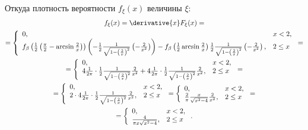 Откуда плотность вероятности $f_\xi(x)$ величины $\xi$:
\begin{multline}
    f_\xi(x)
    = \derivative{x} F_\xi(x) = \\
    = \left \{
    \begin{array}{ll}
        0,                                                                                                                                                                                                                                                                                                                                                                           & x < 2 , \\
        f_\beta \left ( \frac{1}{2} \left ( \frac{\pi}{2} - \arcsin \frac{2}{x} \right ) \right ) \left ( - \frac{1}{2} \frac{1}{\sqrt{ 1 - \left ( \frac{2}{x} \right )^2}} \left ( - \frac{2}{x^2} \right ) \right ) - f_\beta \left ( \frac{1}{2} \arcsin \frac{2}{x} \right ) \frac{1}{2} \frac{1}{\sqrt{ 1 - \left ( \frac{2}{x} \right )^2}} \left ( - \frac{2}{x^2} \right ), & 2 \le x
    \end{array}
    \right . = \\
    = \left \{
    \begin{array}{ll}
        0,                                                                                                                                                                                                               & x < 2 , \\
        4 \frac{1}{2 \pi} \cdot \frac{1}{2} \frac{1}{\sqrt{ 1 - \left ( \frac{2}{x} \right )^2}} \frac{2}{x^2} + 4 \frac{1}{2 \pi} \cdot \frac{1}{2} \frac{1}{\sqrt{ 1 - \left ( \frac{2}{x} \right )^2}} \frac{2}{x^2}, & 2 \le x
    \end{array}
    \right . = \\
    = \left \{
    \begin{array}{ll}
        0,                                                                                                              & x < 2 , \\
        2 \cdot 4 \frac{1}{2 \pi} \cdot \frac{1}{2} \frac{1}{\sqrt{ 1 - \left ( \frac{2}{x} \right )^2}} \frac{2}{x^2}, & 2 \le x
    \end{array}
    \right .
    = \left \{
    \begin{array}{ll}
        0,                                                    & x < 2 , \\
        \frac{2}{\pi} \frac{x}{\sqrt{x^2 - 4}} \frac{2}{x^2}, & 2 \le x
    \end{array}
    \right . = \\
    = \left \{
    \begin{array}{ll}
        0,                              & x < 2 , \\
        \frac{4}{\pi x \sqrt{x^2 - 4}}, & 2 \le x
    \end{array}
    \right .
    .
\end{multline}

